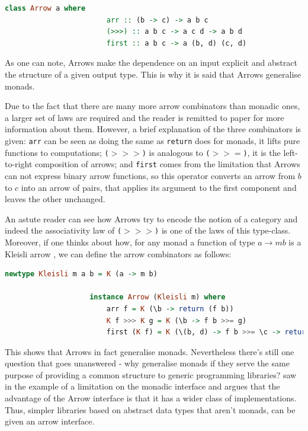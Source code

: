 \documentclass[
  oneside,
  11pt, a4paper,
  footinclude=true,
  headinclude=true,
  cleardoublepage=empty
]{scrbook}
\theoremstyle{definition}
\theoremstyle{definition}
\begin{document}
                \begin{lstlisting}[mathescape, language=Haskell, caption={Arrow type-class},captionpos=b]
                    class Arrow a where
                        arr :: (b -> c) -> a b c
                        (>>>) :: a b c -> a c d -> a b d
                        first :: a b c -> a (b, d) (c, d)
    	        \end{lstlisting}{}
    	       
    As one can note, Arrows make the dependence on an input explicit and abstract the structure of a given output type. This is why it is said that Arrows generalise monads.
    	       
    Due to the fact that there are many more arrow combinators than monadic ones, a larger set of laws are required and the reader is remitted to \cite{Hughes:2000:GMA:347238.347246} paper for more information about them. However, a brief explanation of the three combinators is given: \texttt{arr} can be seen as doing the same as \texttt{return} does for monads, it lifts pure functions to computations; \texttt{($>>>$)} is analogous to \texttt{($>>=$)}, it is the left-to-right composition of arrows; and \texttt{first} comes from the limitation that Arrows can not express binary arrow functions, so this operator converts an arrow from $b$ to $c$ into an arrow of pairs, that applies its argument to the first component and leaves the other unchanged.
    	       
    An astute reader can see how Arrows try to encode the notion of a category and indeed the associativity law of \texttt{($>>>$)} is one of the laws of this type-class. Moreover, if one thinks about how, for any monad a function of type $a \rightarrow m b$ is a Kleisli arrow \citep{Awodey:2010:CT:2060081}, we can define the arrow combinators as follows:
    	        
                \begin{lstlisting}[mathescape, language=Haskell, caption={Arrow Kleisli type-class instance},captionpos=b]
                    newtype Kleisli m a b = K (a -> m b)
                
                    instance Arrow (Kleisli m) where
                        arr f = K (\b -> return (f b))
                        K f >>> K g = K (\b -> f b >>= g)
                        first (K f) = K (\(b, d) -> f b >>= \c -> return (c, d))
                \end{lstlisting}{}
                
    This shows that Arrows in fact generalise monads. Nevertheless there's still one question that goes unanswered - why generalise monads if they serve the same purpose of providing a common structure to generic programming libraries? \cite{Hughes:2000:GMA:347238.347246} saw in the example of \cite{swiestra&duponcheel} a limitation on the monadic interface and argues that the advantage of the Arrow interface is that it has a wider class of implementations. Thus, simpler libraries based on abstract data types that aren't monads, can be given an arrow interface.
                
\end{document}
